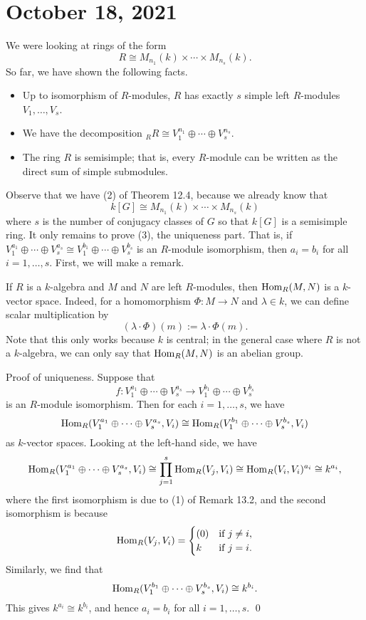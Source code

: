\section{October 18, 2021}
We were looking at rings of the form 
\[ R \cong M_{n_1}(k) \times \cdots \times M_{n_s}(k). \] 
So far, we have shown the following facts. 
\begin{itemize}
    \item Up to isomorphism of $R$-modules, $R$ has exactly $s$ simple left 
    $R$-modules $V_1, \dots, V_s$. 
    \item We have the decomposition ${}_R R \cong V_1^{n_1} \oplus \cdots 
    \oplus V_s^{n_s}$. 
    \item The ring $R$ is semisimple; that is, every $R$-module can be 
    written as the direct sum of simple submodules. 
\end{itemize}

Observe that we have (2) of Theorem 12.4, because we already know that 
\[ k[G] \cong M_{n_1}(k) \times \cdots \times M_{n_s}(k) \] 
where $s$ is the number of conjugacy classes of $G$ so that $k[G]$ is a 
semisimple ring. It only remains to prove (3), the uniqueness part.
That is, if $V_1^{a_1} \oplus \cdots \oplus V_s^{a_s} \cong V_1^{b_1} 
\oplus \cdots \oplus V_s^{b_s}$ is an $R$-module isomorphism, then 
$a_i = b_i$ for all $i = 1, \dots, s$. First, we will make a remark. 

\begin{remark}{}
    If $R$ is a $k$-algebra and $M$ and $N$ are left $R$-modules, then 
    $\operatorname{Hom}_R(M, N)$ is a $k$-vector space. Indeed, for a homomorphism 
    $\Phi : M \to N$ and $\lambda \in k$, we can define scalar multiplication by 
    \[ (\lambda \cdot \Phi)(m) := \lambda \cdot \Phi(m). \] 
    Note that this only works because $k$ is central; in the general case where 
    $R$ is not a $k$-algebra, we can only say that $\operatorname{Hom}_R(M, N)$ is an abelian 
    group. 
\end{remark}

{\sc Proof of uniqueness.} Suppose that 
\[ f : V_1^{a_1} \oplus \cdots \oplus V_s^{a_s} \to V_1^{b_1} \oplus \cdots 
\oplus V_s^{b_s} \] 
is an $R$-module isomorphism. Then for each $i = 1, \dots, s$, we have 
\[ \operatorname{Hom}_R(V_1^{a_1} \oplus \cdots \oplus V_s^{a_s}, V_i) 
\cong \operatorname{Hom}_R(V_1^{b_1} \oplus \cdots \oplus V_s^{b_s}, V_i) \] 
as $k$-vector spaces. Looking at the left-hand side, we have 
\[ \operatorname{Hom}_R(V_1^{a_1} \oplus \cdots \oplus V_s^{a_s}, V_i) 
\cong \prod_{j=1}^s \operatorname{Hom}_R(V_j, V_i) \cong \operatorname{Hom}_R(V_i, V_i)^{a_i} \cong k^{a_i}, \] 
where the first isomorphism is due to (1) of Remark 13.2, and the second isomorphism
is because 
\[ \operatorname{Hom}_R(V_j, V_i) = \begin{cases} (0) & \text{if } j \neq i, \\ 
    k & \text{if } j = i. \end{cases} \] 
Similarly, we find that 
\[ \operatorname{Hom}_R(V_1^{b_1} \oplus \cdots \oplus V_s^{b_s}, V_i) \cong k^{b_i}. \] 
This gives $k^{a_i} \cong k^{b_i}$, and hence $a_i = b_i$ for all $i = 1, \dots, s$. \qed

